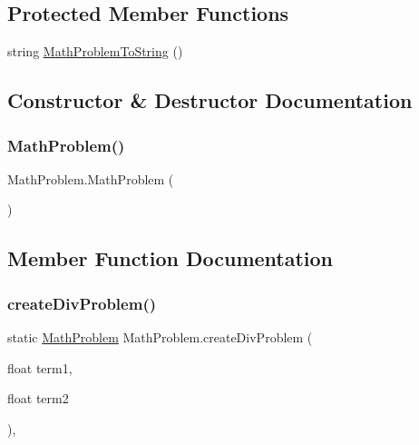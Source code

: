 \subsection*{Protected Member Functions}
\begin{DoxyCompactItemize}
\item 
string \hyperlink{classMathProblem_a86f02a3cff9240c588b406fd9acf2969}{Math\+Problem\+To\+String} ()
\end{DoxyCompactItemize}


\subsection{Constructor \& Destructor Documentation}
\mbox{\label{classMathProblem_ad2df5ab798f1d5565f92db064a4683c1}} 
\subsubsection{\texorpdfstring{Math\+Problem()}{MathProblem()}}
{\footnotesize\ttfamily Math\+Problem.\+Math\+Problem (\begin{DoxyParamCaption}{ }\end{DoxyParamCaption})\hspace{0.3cm}{\ttfamily [inline]}}



\subsection{Member Function Documentation}
\mbox{\label{classMathProblem_a44cd76c9f75e5c87e2a808d3b7a39793}} 
\subsubsection{\texorpdfstring{create\+Div\+Problem()}{createDivProblem()}}
{\footnotesize\ttfamily static \hyperlink{classMathProblem}{Math\+Problem} Math\+Problem.\+create\+Div\+Problem (\begin{DoxyParamCaption}\item[{float}]{term1,  }\item[{float}]{term2 }\end{DoxyParamCaption})\hspace{0.3cm}{\ttfamily [inline]}, {\ttfamily [static]}}

